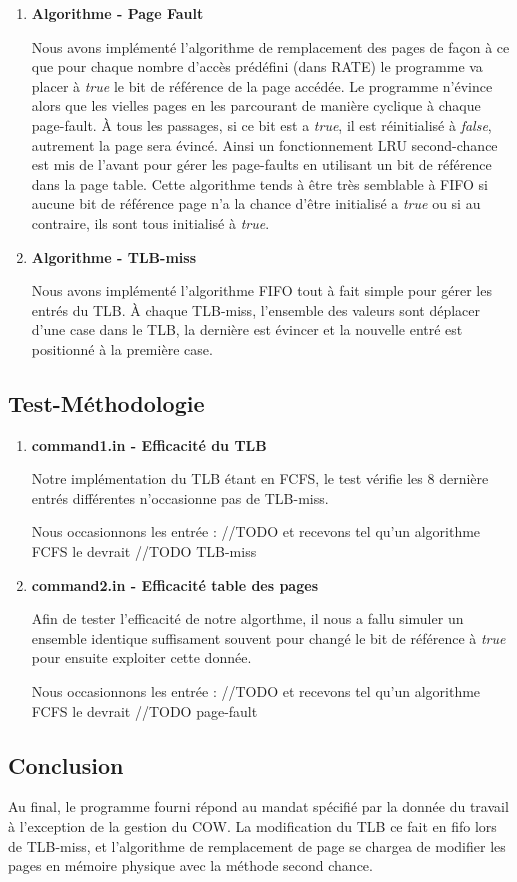 \documentclass{article}
\begin{document}
\begin{enumerate}
	
	\item \textbf{Algorithme - Page Fault} 
	
  Nous avons implémenté l'algorithme de remplacement des pages de façon à ce que pour chaque nombre d'accès prédéfini (dans RATE) le programme va placer à 
  {\em true} le bit de référence de la page accédée. Le programme n'évince alors que les vielles pages en les parcourant de manière cyclique à chaque page-fault. À tous les passages, si ce bit est a {\em true}, il est réinitialisé à {\em false}, autrement la page sera évincé. Ainsi un fonctionnement LRU second-chance est mis de l'avant pour gérer les page-faults en utilisant un bit de référence dans la page table. Cette algorithme tends à être très semblable à FIFO si aucune bit de référence page n'a la chance d'être initialisé a {\em true} ou si au contraire, ils sont tous initialisé à {\em true}.
  
  \item \textbf{Algorithme - TLB-miss} 
  
  Nous avons implémenté l'algorithme FIFO tout à fait simple pour gérer les entrés du TLB. À chaque TLB-miss,
  l'ensemble des valeurs sont déplacer d'une case dans le TLB, la dernière est évincer et la nouvelle entré est positionné à la première case.
	
	
\end{enumerate}


\subsection*{Test-Méthodologie}

\begin{enumerate}
	\item \textbf{command1.in - Efficacité du TLB} 
	
	Notre implémentation du TLB étant en FCFS, le test vérifie les 8 dernière entrés différentes n'occasionne pas de TLB-miss.
	
	Nous occasionnons les entrée : //TODO
	et recevons tel qu'un algorithme FCFS le devrait //TODO TLB-miss
	
	\item \textbf{command2.in - Efficacité table des pages} 
	
	Afin de tester l'efficacité de notre algorthme, il nous a fallu simuler un ensemble identique suffisament souvent pour changé le bit de référence à {\em true} pour ensuite exploiter cette donnée.
	
	Nous occasionnons les entrée : //TODO
	et recevons tel qu'un algorithme FCFS le devrait //TODO page-fault
	
	
\end{enumerate}

\subsection*{Conclusion}
Au final, le programme fourni répond au mandat spécifié par la donnée du travail à l'exception de la gestion du COW. La modification du TLB ce fait en fifo lors de TLB-miss, et l'algorithme de remplacement de page se chargea de modifier les pages en mémoire physique avec la méthode second chance. 
\end{document}
